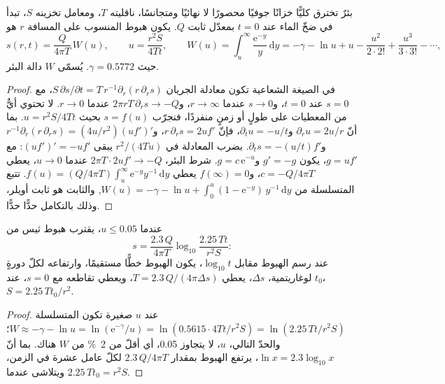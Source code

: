 \begin{theorem}[حلّ ثيس]\label{thm:b3:hydrogeology:theis}
بئرٌ تخترق كليًّا خزانًا جوفيًا محصورًا لا نهائيًا ومتجانسًا، ناقليته $T$،
ومعامل تخزينه $S$، تبدأ في ضخّ الماء عند $t = 0$ بمعدّل ثابت $Q$.
يكون هبوط المنسوب على المسافة $r$ هو
\[
s(r, t) = \frac{Q}{4\pi T}\,W(u), \qquad u = \frac{r^2S}{4Tt}, \qquad
W(u) = \int_u^\infty\frac{\mathrm e^{-y}}{y}\,\mathrm dy = -\gamma - \ln u +
u - \frac{u^2}{2\cdot2!} + \frac{u^3}{3\cdot3!} - \cdots,
\]
حيث $\gamma = \num{0.5772}$. يُسمّى $W$ دالة البئر.
\end{theorem}

\begin{proof}
في الصيغة الشعاعية تكون معادلة الجريان $S\,\partial s/\partial t =
T\,r^{-1}\partial_r(r\,\partial_rs)$، مع $s = 0$ عند $t = 0$، و$s \to 0$ عندما
$r \to \infty$، و$2\pi rT\,\partial_rs \to -Q$ عندما $r \to 0$. لا تحتوي أيٌّ من
المعطيات على طولٍ أو زمنٍ منفردًا، فنجرّب $s = f(u)$ بحيث $u =
r^2S/4Tt$. بما أنّ $\partial_ru = 2u/r$ و$\partial_tu = -u/t$، فإنّ $r\,\partial_rs =
2uf'$، و$r^{-1}\partial_r(r\,\partial_rs) = (4u/r^2)(uf')'$ و$\partial_ts =
-(u/t)f'$. بضرب المعادلة في $r^2/(4Tu)$ يبقى $(uf')' = -uf'$:
مع $g = uf'$، يكون $g' = -g$ و$g = c\,\mathrm e^{-u}$. شرط البئر، $2\pi T\cdot2uf' \to -Q$ عندما $u \to 0$، يعطي $c =
-Q/4\pi T$، و$f(\infty) = 0$ يعطي $f(u) = (Q/4\pi T)\int_u^\infty
\mathrm e^{-y}y^{-1}\,\mathrm dy$. تتبع المتسلسلة من
$W(u) = -\gamma - \ln u + \int_0^u(1 - \mathrm e^{-y})\,y^{-1}\,\mathrm dy$,
والثابت هو ثابت أويلر، وذلك بالتكامل حدًّا حدًّا.
\end{proof}

\begin{proposition}\label{prop:b3:hydrogeology:cooper-jacob}
عندما $u \le 0.05$، يقترب هبوط ثيس من
\[
s = \frac{2.3\,Q}{4\pi T}\log_{10}\frac{2.25\,Tt}{r^2S} :
\]
عند رسم الهبوط مقابل $\log_{10}t$، يكون الهبوط خطًّا مستقيمًا، وارتفاعه لكلّ
دورةٍ لوغاريتمية، $\Delta s$، يعطي  $T = 2.3\,Q/(4\pi\Delta s)$، ويعطي تقاطعه
مع $s = 0$، عند $t_0$،  $S = 2.25\,Tt_0/r^2$.
\end{proposition}

\begin{proof}
عند $u$ صغيرة تكون المتسلسلة $W \approx -\gamma - \ln u = \ln(\mathrm
e^{-\gamma}/u) = \ln(0.5615\cdot4Tt/r^2S) = \ln(2.25\,Tt/r^2S)$؛ والحدّ التالي،
$u$، لا يتجاوز \num{0.05}، أي أقلّ من \qty{2}{\percent} من $W$ هناك.
بما أنّ $\ln x = 2.3\log_{10}x$، يرتفع الهبوط بمقدار $2.3\,Q/4\pi T$ لكلّ
عامل عشرة في الزمن، ويتلاشى عندما $2.25\,Tt_0 = r^2S$.
\end{proof}

